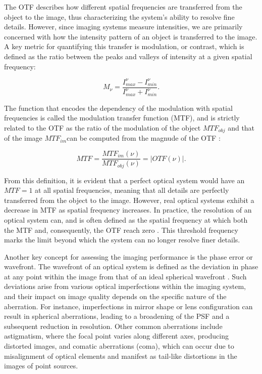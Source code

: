 The OTF describes how different spatial frequencies are transferred from the object to the image, thus characterizing the system's ability to resolve fine details. However, since imaging systems measure intensities, we are primarily concerned with how the intensity pattern of an object is transferred to the image. A key metric for quantifying this transfer is modulation, or contrast, which is defined as the ratio between the peaks and valleys of intensity at a given spatial frequency:

\begin{equation}
  M _ {\nu} = \frac{I_{max} ^{\nu} - I_{min} ^{\nu}}{I_{max} ^{\nu} + I_{min} ^{\nu}}.
\end{equation}

The function that encodes the dependency of the modulation with spatial frequencies is called the modulation transfer function (MTF), and is strictly related to the OTF as the ratio of the modulation of the object $MTF_{obj}$ and that of the image $MTF_{im} $can be computed from the magnude of the OTF \citep{OTF}:

\begin{equation}
  MTF = \frac{MTF_{im}(\nu)}{MTF_{obj}(\nu)} = | OTF(\nu) |.
\end{equation}

From this definition, it is evident that a perfect optical system would have an $MTF=1$ at all spatial frequencies, meaning that all details are perfectly transferred from the object to the image. However, real optical systems exhibit a decrease in MTF as spatial frequency increases. In practice, the resolution of an optical system can, and is often defined as the spatial frequency at which both the MTF and, consequently, the OTF reach zero \citep{wfes}. This threshold frequency marks the limit beyond which the system can no longer resolve finer details. 

Another key concept for assessing the imaging performance is the phase error or wavefront. The wavefront of an optical system is defined as the deviation in phase at any point within the image from that of an ideal spherical wavefront \citep{WFE_def}. Such deviations arise from various optical imperfections within the imaging system, and their impact on image quality depends on the specific nature of the aberration. For instance, imperfections in mirror shape or lens configuration can result in spherical aberrations, leading to a broadening of the PSF and a subsequent reduction in resolution. Other common aberrations include astigmatism, where the focal point varies along different axes, producing distorted images, and comatic aberrations (coma), which can occur due to misalignment of optical elements and manifest as tail-like distortions in the images of point sources.

